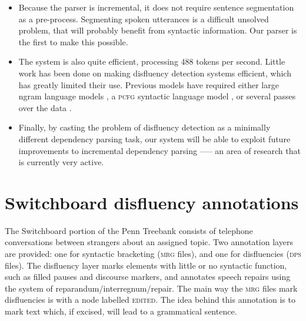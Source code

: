 \documentclass[11pt,letterpaper]{article}
\newcommand{\pcfg}{\textsc{pcfg}\xspace}
\begin{document}
\begin{itemize}
    \item Because the parser is incremental, it does not require sentence segmentation
        as a pre-process. Segmenting spoken utterances is a difficult unsolved
        problem, that will probably benefit from syntactic information. Our parser
        is the first to make this possible.

    \item The system is also quite efficient, processing 488 tokens per second.
        Little work has been done on making disfluency detection systems efficient,
        which has greatly limited their use. Previous models have required either
        large ngram language models \citep{zwarts:11}, a \pcfg syntactic language
        model \citep{Johnson04a}, or several passes over the data \citep{qian:13}.

    \item Finally, by casting the problem of disfluency detection as a minimally
           different dependency parsing task, our system will be able to exploit
           future improvements to incremental dependency parsing —-- an area of
           research that is currently very active.
\end{itemize}

\section{Switchboard disfluency annotations}

The Switchboard portion of the Penn Treebank \citep{marcus:93} consists of
telephone conversations between strangers about
an assigned topic.  Two annotation layers are provided: one for syntactic
bracketing (\textsc{mrg} files),
and one for disfluencies (\textsc{dps} files).  The disfluency layer marks
elements with little or no syntactic function, such as filled pauses and discourse
markers, and annotates speech repairs using the \citet{shriberg:94} system of
reparandum/interregnum/repair.
The main way the \textsc{mrg} files mark disfluencies is with a node labelled
\textsc{edited}.  The idea behind this annotation is to mark text which, if
excised, will lead to a grammatical sentence.

\end{document}
